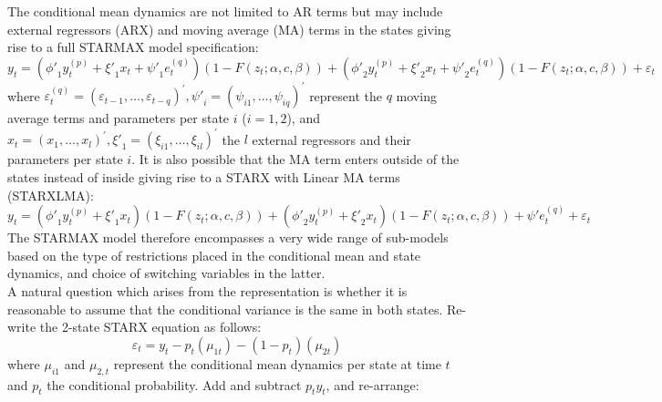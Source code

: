 The conditional mean dynamics are not limited to AR terms but may include
external regressors (ARX) and moving average (MA) terms in the states giving
rise to a full STARMAX model specification:
\begin{equation}\label{eq:starmax}
{y_t} = \left( {{{\phi '}_1}y_t^{\left( p \right)} + {{\xi '}_1}{x_t} + {{\psi
'}_1}e_t^{\left( q \right)}} \right)\left( {1 - F\left( {{z_t};\alpha ,c,\beta } \right)} \right) + \left( {{{\phi '}_2}y_t^{\left( p \right)} + {{\xi '}_2}{x_t} + {{\psi '}_2}e_t^{\left( q \right)}} \right)\left( {1 - F\left( {{z_t};\alpha ,c,\beta } \right)} \right) + {\varepsilon _t}
\end{equation}
where $\varepsilon _t^{\left( q \right)} = {\left( {{\varepsilon _{t -
1}},\dots,{\varepsilon _{t - q}}} \right)^\prime },{{\psi '}_i} = {\left( {{\psi
_{i1}},\dots,{\psi _{iq}}} \right)^\prime }$ represent the $q$ moving average
terms and parameters per state $i$ ($i=1,2$), and ${x_t} = {\left(
{{x_1},\dots,{x_l}} \right)^\prime },{{\xi '}_1} = {\left( {{\xi
_{i1}},\dots,{\xi _{il}}} \right)^\prime }$ the $l$ external regressors and
their parameters per state $i$. It is also possible that the MA term enters
outside of the states instead of inside giving rise to a STARX with Linear MA
terms (STARXLMA):
\begin{equation}
{y_t} = \left( {{{\phi '}_1}y_t^{\left( p \right)} + {{\xi '}_1}{x_t}}
\right)\left( {1 - F\left( {{z_t};\alpha ,c,\beta } \right)} \right) + \left(
{{{\phi '}_2}y_t^{\left( p \right)} + {{\xi '}_2}{x_t}} \right)\left( {1 -
F\left( {{z_t};\alpha ,c,\beta } \right)} \right) + \psi 'e_t^{\left( q \right)}
+{\varepsilon _t}
\end{equation}
The STARMAX model therefore encompasses a very wide range of sub-models based on
the type of restrictions placed in the conditional mean and state dynamics, and
choice of switching variables in the latter.\\
A natural question which arises from the representation is whether it is
reasonable to assume that the conditional variance is the same in both states.
Re-write the 2-state STARX equation as follows:
\begin{equation}
{\varepsilon _t} = {y_t} - {p_t}\left( {{\mu _{1t}}} \right) - \left( {1 -
{p_t}} \right)\left( {{\mu _{2t}}} \right)
\end{equation}
where $\mu_{i1}$ and $\mu_{2,t}$ represent the conditional mean dynamics per
state at time $t$ and $p_t$ the conditional probability. Add and subtract
${p_t}{y_t}$, and re-arrange:
